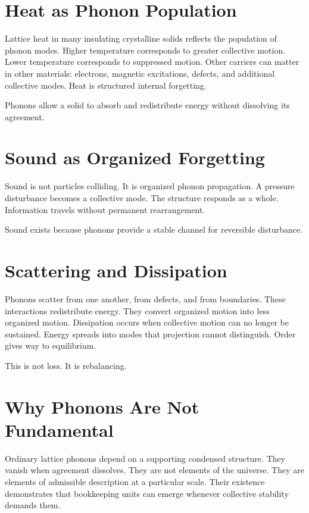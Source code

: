 \documentclass[11pt,twoside,openright]{book}
\begin{document}
\section*{Heat as Phonon Population}

Lattice heat in many insulating crystalline solids reflects the population of phonon modes. Higher temperature corresponds to greater collective motion. Lower temperature corresponds to suppressed motion. Other carriers can matter in other materials: electrons, magnetic excitations, defects, and additional collective modes. Heat is structured internal forgetting.

Phonons allow a solid to absorb and redistribute energy without dissolving its agreement.

\section*{Sound as Organized Forgetting}

Sound is not particles colliding. It is organized phonon propagation. A pressure disturbance becomes a collective mode. The structure responds as a whole. Information travels without permanent rearrangement.

Sound exists because phonons provide a stable channel for reversible disturbance.

\section*{Scattering and Dissipation}

Phonons scatter from one another, from defects, and from boundaries. These interactions redistribute energy. They convert organized motion into less organized motion. Dissipation occurs when collective motion can no longer be sustained. Energy spreads into modes that projection cannot distinguish. Order gives way to equilibrium.

This is not loss. It is rebalancing.

\section*{Why Phonons Are Not Fundamental}

Ordinary lattice phonons depend on a supporting condensed structure. They vanish when agreement dissolves. They are not elements of the universe. They are elements of admissible description at a particular scale. Their existence demonstrates that bookkeeping units can emerge whenever collective stability demands them.
\end{document}
